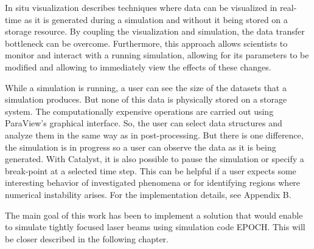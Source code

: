 In situ visualization describes techniques where data can be visualized in real-time as it is generated during a simulation and without it being stored on a storage resource. By coupling the visualization and simulation, the data transfer bottleneck can be overcome. Furthermore, this approach allows scientists to monitor and interact with a running simulation, allowing for its parameters to be modified and allowing to immediately view the effects of these changes.

While a simulation is running, a user can see the size of the datasets that a simulation produces. But none of this data is physically stored on a storage system. The computationally expensive operations are carried out using ParaView’s graphical interface. So, the user can select data structures and analyze them in the same way as in post-processing. But there is one difference, the simulation is in progress so a user can observe the data as it is being generated. With Catalyst, it is also possible to pause the simulation or specify a break-point at a selected time step. This can be helpful if a user expects some interesting behavior of investigated phenomena or for identifying regions where numerical instability arises. For the implementation details, see Appendix B.

The main goal of this work has been to implement a solution that would enable to simulate tightly focused laser beams using simulation code EPOCH. This will be closer described in the following chapter.

